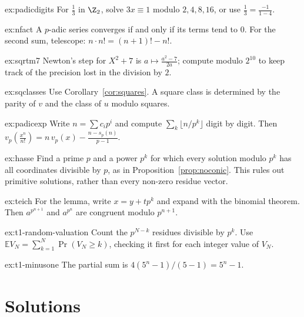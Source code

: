 \begin{hint}{ex:padicdigits}
For $\frac13$ in $\Z_2$, solve $3x\equiv1$ modulo $2,4,8,16$, or use $\frac13=\frac{-1}{1-4}$.
\end{hint}
\begin{hint}{ex:nfact}
A $p$-adic series converges if and only if its terms tend to $0$. For the second sum, telescope: $n\cdot n!=(n+1)!-n!$.
\end{hint}
\begin{hint}{ex:sqrtm7}
Newton's step for $X^2+7$ is $a\mapsto\frac{a^2-7}{2a}$; compute modulo $2^{10}$ to keep track of the precision lost in the division by $2$.
\end{hint}
\begin{hint}{ex:sqclasses}
Use Corollary~\ref{cor:squares}. A square class is determined by the parity of $v$ and the class of $u$ modulo squares.
\end{hint}
\begin{hint}{ex:padicexp}
Write $n=\sum c_ip^i$ and compute $\sum_k\lfloor n/p^k\rfloor$ digit by digit. Then $v_p\left(\frac{x^n}{n!}\right)=n\,v_p(x)-\frac{n-s_p(n)}{p-1}$.
\end{hint}
\begin{hint}{ex:hasse}
Find a prime $p$ and a power $p^k$ for which every solution modulo $p^k$ has all coordinates divisible by $p$, as in Proposition~\ref{prop:noconic}. This rules out primitive solutions, rather than every non-zero residue vector.
\end{hint}
\begin{hint}{ex:teich}
For the lemma, write $x=y+tp^k$ and expand with the binomial theorem. Then $a^{p^{n+1}}$ and $a^{p^n}$ are congruent modulo $p^{n+1}$.
\end{hint}

\begin{hint}{ex:t1-random-valuation}
Count the $p^{N-k}$ residues divisible by $p^k$.
Use $\mathbb E V_N=\sum_{k=1}^N\operatorname{Pr}(V_N\ge k)$,
checking it first for each integer value of $V_N$.
\end{hint}

\begin{hint}{ex:t1-minusone}
The partial sum is $4(5^n-1)/(5-1)=5^n-1$.
\end{hint}

\section{Solutions}

